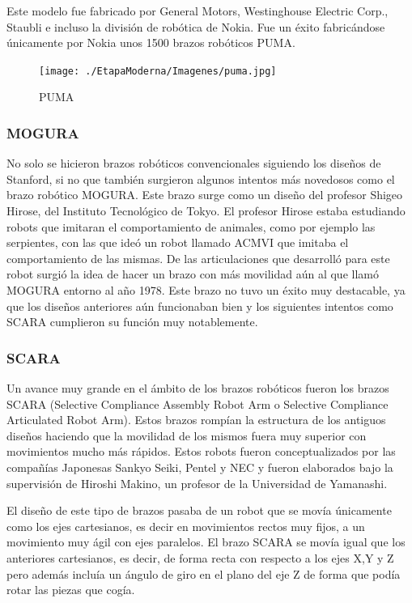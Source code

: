 Este modelo fue fabricado por General Motors, Westinghouse Electric Corp., Staubli e incluso la división de robótica de Nokia. Fue un éxito fabricándose únicamente por Nokia unos 1500 brazos robóticos PUMA.

\begin{figure}[!h]
	\centering
	\texttt{[image: ./EtapaModerna/Imagenes/puma.jpg]}
	\caption{PUMA}
	\label{fig:puma}
\end{figure}

\subsubsection{MOGURA}

No solo se hicieron brazos robóticos convencionales siguiendo los diseños de Stanford, si no que también surgieron algunos intentos más novedosos como el brazo robótico MOGURA. Este brazo surge como un diseño del profesor Shigeo Hirose, del Instituto Tecnológico de Tokyo. El profesor Hirose estaba estudiando robots que imitaran el comportamiento de animales, como por ejemplo las serpientes, con las que ideó un robot llamado ACMVI que imitaba el comportamiento de las mismas. De las articulaciones que desarrolló para este robot surgió la idea de hacer un brazo con más movilidad aún al que llamó MOGURA entorno al año 1978. Este brazo no tuvo un éxito muy destacable, ya que los diseños anteriores aún funcionaban bien y los siguientes intentos como SCARA cumplieron su función muy notablemente.

\subsubsection{SCARA}
Un avance muy grande en el ámbito de los brazos robóticos fueron los brazos SCARA (Selective Compliance Assembly Robot Arm o Selective Compliance Articulated Robot Arm). Estos brazos rompían la estructura de los antiguos diseños haciendo que la movilidad de los mismos fuera muy superior con movimientos mucho más rápidos. Estos robots fueron conceptualizados por las compañías Japonesas Sankyo Seiki, Pentel y NEC y fueron elaborados bajo la supervisión de Hiroshi Makino, un profesor de la Universidad de Yamanashi.

El diseño de este tipo de brazos pasaba de un robot que se movía únicamente como los ejes cartesianos, es decir en movimientos rectos muy fijos, a un movimiento muy ágil con ejes paralelos. El brazo SCARA se movía igual que los anteriores cartesianos, es decir, de forma recta con respecto a los ejes X,Y y Z pero además incluía un ángulo de giro en el plano del eje Z de forma que podía rotar las piezas que cogía.

